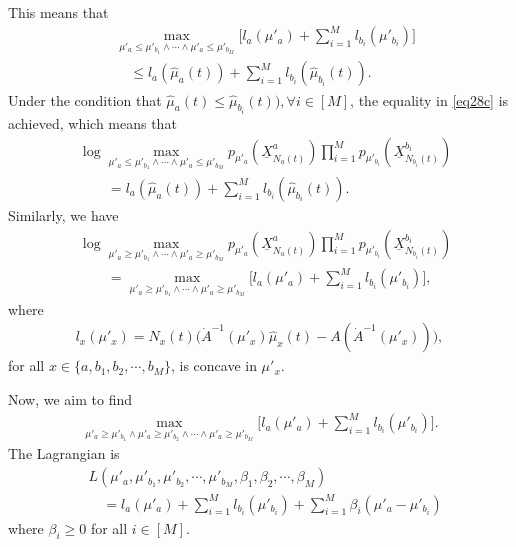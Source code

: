 \documentclass[final]{IEEEtran}
\newcommand{\nn}{\nonumber}
\begin{document}
This means that
\begin{align}
&\max_{\mu'_a\leq \mu'_{b_1}  \wedge \cdots \wedge \mu'_a \leq \mu'_{b_M} }\bigg[l_a(\mu'_a)+\sum_{i=1}^M l_{b_i}(\mu'_{b_i})\bigg]\nn\\
&\quad \leq l_a(\hat{\mu}_a(t))+ \sum_{i=1}^M l_{b_i}(\hat{\mu}_{b_i}(t))\label{eq28c}.
\end{align}
Under the condition that $\hat{\mu}_a(t)\leq \hat{\mu}_{b_i}(t)), \forall i \in [M]$, the equality in \eqref{eq28c} is achieved, which means that
\begin{align}
&\log \max_{\mu'_a\leq \mu'_{b_1}\wedge \cdots \wedge \mu'_a \leq \mu'_{b_M}}p_{\mu'_a}(\underline{X}_{N_a(t)}^a) \prod_{i=1}^M p_{\mu'_{b_i}}(\underline{X}_{N_{b_i}(t)}^{b_i})\nn\\
&\qquad= l_a(\hat{\mu}_a(t))+ \sum_{i=1}^M l_{b_i}(\hat{\mu}_{b_i}(t)) \label{eq29mod}.
\end{align}
Similarly, we have
\begin{align}
&\log \max_{\mu'_a\geq \mu'_{b_1} \wedge  \cdots \wedge \mu'_a \geq \mu'_{b_M}}p_{\mu'_a}(\underline{X}_{N_a(t)}^a) \prod_{i=1}^M p_{\mu'_{b_i}}(\underline{X}_{N_{b_i}(t)}^{b_i})\nn\\
&\qquad =\max_{\mu'_a\geq \mu'_{b_1}  \wedge \cdots \wedge \mu'_a \geq \mu'_{b_M}}\bigg[l_a(\mu'_a)+\sum_{i=1}^M l_{b_i}(\mu'_{b_i})\bigg],
\end{align} where
\begin{align}
l_x(\mu'_x)=N_x(t)\bigg(\dot{A}^{-1}(\mu'_x)\hat{\mu}_x(t)-A(\dot{A}^{-1}(\mu'_x))\bigg),
\end{align} for all $x \in \{a,b_1,b_2,\cdots,b_M\}$, is concave in $\mu'_x$.

Now, we aim to find 
\begin{align}
\max_{\mu'_a\geq \mu'_{b_1} \wedge \mu'_a \geq \mu'_{b_2} \wedge \cdots \wedge \mu'_a \geq \mu'_{b_M}}\bigg[l_a(\mu'_a)+\sum_{i=1}^M l_{b_i}(\mu'_{b_i})\bigg].
\end{align}
The Lagrangian is 
\begin{align}
&L(\mu'_a,\mu'_{b_1},\mu'_{b_2},\cdots,\mu'_{b_M},\beta_1,\beta_2,\cdots,\beta_M)\nn\\
&\quad =l_a(\mu'_a)+\sum_{i=1}^M l_{b_i}(\mu'_{b_i})+\sum_{i=1}^M \beta_i (\mu'_a-\mu'_{b_i})
\end{align} where $\beta_i \geq 0$ for all $i \in [M]$. 
\end{document}
